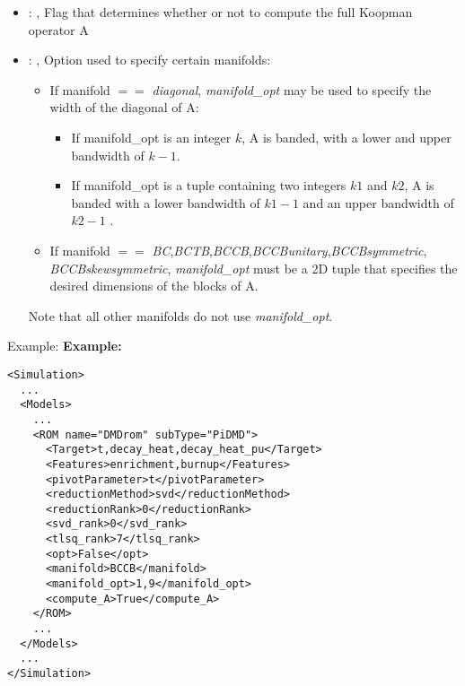 \begin{itemize}
    \item {}: ,
      Flag that determines whether or not to compute the full Koopman operator A

    \item {}: ,
      Option used to specify certain manifolds:
      \begin{itemize}                                                    \item If manifold $==$
      \textit{diagonal}, \textit{manifold\_opt} may be used to specify the width of the diagonal of
      A:                                                    \begin{itemize}
      \item If manifold\_opt is an integer $k$, A is banded, with a lower and upper bandwidth of
      $k-1$.                                                      \item If manifold\_opt is a tuple
      containing two integers $k1$ and $k2$, A is banded with
      a lower bandwidth of $k1-1$ and an upper bandwidth of $k2-1$
      .   \end{itemize}                                                    \item If manifold $==$
      \textit{BC},\textit{BCTB},\textit{BCCB},\textit{BCCBunitary},\textit{BCCBsymmetric},
      \textit{BCCBskewsymmetric}, \textit{manifold\_opt} must be a 2D tuple that specifies the
      desired dimensions                                                       of the blocks of A.
      \end{itemize}                                                   Note that all other manifolds
      do not use \textit{manifold\_opt}.
  \end{itemize}

\hspace{24pt}
Example:
\textbf{Example:}
\begin{lstlisting}[style=XML,morekeywords={name,subType}]
<Simulation>
  ...
  <Models>
    ...
    <ROM name="DMDrom" subType="PiDMD">
      <Target>t,decay_heat,decay_heat_pu</Target>
      <Features>enrichment,burnup</Features>
      <pivotParameter>t</pivotParameter>
      <reductionMethod>svd</reductionMethod>
      <reductionRank>0</reductionRank>
      <svd_rank>0</svd_rank>
      <tlsq_rank>7</tlsq_rank>
      <opt>False</opt>
      <manifold>BCCB</manifold>
      <manifold_opt>1,9</manifold_opt>
      <compute_A>True</compute_A>
    </ROM>
    ...
  </Models>
  ...
</Simulation>
\end{lstlisting}

